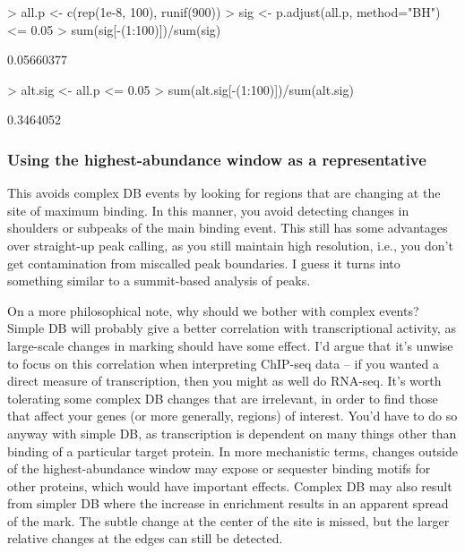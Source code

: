 \documentclass[12pt]{report}
\renewenvironment{Schunk}{\vspace{0pt}}{\vspace{0pt}}
\begin{document}
\begin{Schunk}
\begin{Sinput}
> all.p <- c(rep(1e-8, 100), runif(900))
> sig <- p.adjust(all.p, method="BH") <= 0.05
> sum(sig[-(1:100)])/sum(sig)
\end{Sinput}
\begin{Soutput}
[1] 0.05660377
\end{Soutput}
\begin{Sinput}
> alt.sig <- all.p <= 0.05
> sum(alt.sig[-(1:100)])/sum(alt.sig)
\end{Sinput}
\begin{Soutput}
[1] 0.3464052
\end{Soutput}
\end{Schunk}

\subsubsection*{Using the highest-abundance window as a representative}

This avoids complex DB events by looking for regions that are changing at the site of maximum binding.
In this manner, you avoid detecting changes in shoulders or subpeaks of the main binding event.
This still has some advantages over straight-up peak calling, as you still maintain high resolution, i.e., you don't get contamination from miscalled peak boundaries.
I guess it turns into something similar to a summit-based analysis of peaks.

On a more philosophical note, why should we bother with complex events?
Simple DB will probably give a better correlation with transcriptional activity, as large-scale changes in marking should have some effect.
I'd argue that it's unwise to focus on this correlation when interpreting ChIP-seq data -- if you wanted a direct measure of transcription, then you might as well do RNA-seq.
It's worth tolerating some complex DB changes that are irrelevant, in order to find those that affect your genes (or more generally, regions) of interest.
You'd have to do so anyway with simple DB, as transcription is dependent on many things other than binding of a particular target protein.
In more mechanistic terms, changes outside of the highest-abundance window may expose or sequester binding motifs for other proteins, which would have important effects.
Complex DB may also result from simpler DB where the increase in enrichment results in an apparent spread of the mark.
The subtle change at the center of the site is missed, but the larger relative changes at the edges can still be detected.
\end{document}
